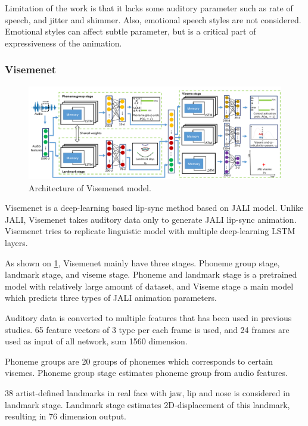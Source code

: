 \documentclass[10pt,twocolumn,letterpaper]{article}
\begin{document}
Limitation of the work is that it lacks some auditory parameter such as rate of speech, and jitter and shimmer. Also, emotional speech styles are not considered. Emotional styles can affect subtle parameter, but is a critical part of expressiveness of the animation.

\subsubsection{Visemenet}

\begin{figure}
   \centering
   \includegraphics[width=1.0\linewidth]{VisemenetArchitecture}
   \caption{Architecture of Visemenet model.}
   \label{fig:VisemenetArchitecture}
\end{figure}



Visemenet is a deep-learning based lip-sync method based on JALI model. Unlike JALI, Visemenet takes auditory data only to generate JALI lip-sync animation. Visemenet tries to replicate linguistic model with multiple deep-learning LSTM layers.

As shown on \cref{fig:VisemenetArchitecture}, Visemenet mainly have three stages. Phoneme group stage, landmark stage, and viseme stage. Phoneme and landmark stage is a pretrained model with relatively large amount of dataset, and Viseme stage a main model which predicts three types of JALI animation parameters.

Auditory data is converted to multiple features that has been used in previous studies. 65 feature vectors of 3 type per each frame is used, and 24 frames are used as input of all network, sum 1560 dimension.

Phoneme groups are 20 groups of phonemes which corresponds to certain visemes. Phoneme group stage estimates phoneme group from audio features.

38 artist-defined landmarks in real face with jaw, lip and nose is considered in landmark stage. Landmark stage estimates 2D-displacement of this landmark, resulting in 76 dimension output.
\end{document}
